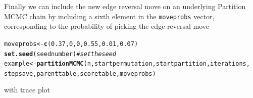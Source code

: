\documentclass[a4paper]{article}\usepackage[]{graphicx}\usepackage[]{color}
\makeatletter
\newcommand{\hlnum}[1]{\textcolor[rgb]{0.686,0.059,0.569}{#1}}%
\newcommand{\hlcom}[1]{\textcolor[rgb]{0.678,0.584,0.686}{\textit{#1}}}%
\newcommand{\hlstd}[1]{\textcolor[rgb]{0.345,0.345,0.345}{#1}}%
\newcommand{\hlkwb}[1]{\textcolor[rgb]{0.69,0.353,0.396}{#1}}%
\newcommand{\hlkwd}[1]{\textcolor[rgb]{0.737,0.353,0.396}{\textbf{#1}}}%
\newenvironment{kframe}{%
 \def\at@end@of@kframe{}%
 \ifinner\ifhmode%
  \def\at@end@of@kframe{\end{minipage}}%
  \begin{minipage}{\columnwidth}%
 \fi\fi%
 \def\FrameCommand##1{\hskip\@totalleftmargin \hskip-\fboxsep
 \colorbox{shadecolor}{##1}\hskip-\fboxsep
     \hskip-\linewidth \hskip-\@totalleftmargin \hskip\columnwidth}%
 \MakeFramed {\advance\hsize-\width
   \@totalleftmargin\z@ \linewidth\hsize
   \@setminipage}}%
 {\par\unskip\endMakeFramed%
 \at@end@of@kframe}
\newenvironment{knitrout}{}{} %
\newcommand{\nn}{\noindent}
\makeatother
\begin{document}
\nn Finally we can include the new edge reversal move on an underlying Partition MCMC chain by including a sixth element in the \texttt{moveprobs} vector, corresponding to the probability of picking the edge reversal move

\begin{knitrout}
\color{fgcolor}\begin{kframe}
\begin{alltt}
\hlstd{moveprobs} \hlkwb{<-} \hlkwd{c}\hlstd{(}\hlnum{0.37}\hlstd{,} \hlnum{0}\hlstd{,} \hlnum{0}\hlstd{,} \hlnum{0.55}\hlstd{,} \hlnum{0.01}\hlstd{,} \hlnum{0.07}\hlstd{)}
\hlkwd{set.seed}\hlstd{(seednumber)}  \hlcom{# set the seed}
\hlstd{example} \hlkwb{<-} \hlkwd{partitionMCMC}\hlstd{(n, startpermutation, startpartition, iterations,}
    \hlstd{stepsave, parenttable, scoretable, moveprobs)}
\end{alltt}
\end{kframe}
\end{knitrout}

\nn with trace plot
\end{document}
